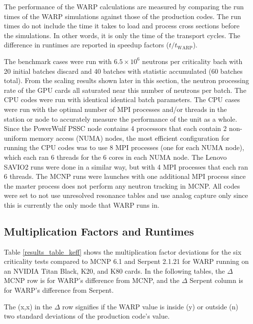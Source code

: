 \documentclass[preprint,12pt]{elsarticle}
\begin{document}
The performance of the WARP calculations are measured by comparing the run times of the WARP simulations against those of the production codes.  The run times do not include the time it takes to load and process cross sections before the simulations.  In other words, it is only the time of the transport cycles.  The difference in runtimes are reported in speedup factors ($t/t_\mathrm{WARP}$). 

The benchmark cases were run with $6.5\times10^6$ neutrons per criticality bach with 20 initial batches discard and 40 batches with statistic accumulated (60 batches total).  From the scaling results shown later in this section, the neutron processing rate of the GPU cards all saturated near this number of neutrons per batch.  The CPU codes were run with identical identical batch parameters.  The CPU cases were run with the optimal number of MPI processes and/or threads in the station or node to accurately measure the performance of the unit as a whole.  Since the PowerWulf PSSC node contains 4 processors that each contain 2 non-uniform memory access (NUMA) nodes, the most efficient configuration for running the CPU codes was to use 8 MPI processes (one for each NUMA node), which each ran 6 threads for the 6 cores in each NUMA node.  The Lenovo SAVIO2 runs were done in a similar way, but with 4 MPI processes that each ran 6 threads.  The MCNP runs were launches with one additional MPI process since the master process does not perform any neutron tracking in MCNP.  All codes were set to not use unresolved resonance tables and use analog capture only since this is currently the only mode that WARP runs in.

\subsection{Multiplication Factors and Runtimes}

Table \ref{results_table_keff} shows the multiplication factor deviations for the six criticality tests compared to MCNP 6.1 and Serpent 2.1.21 for WARP running on an NVIDIA Titan Black, K20, and K80 cards.  In the following tables, the $\Delta$MCNP row is for WARP's difference from MCNP, and the $\Delta$ Serpent column is for WARP's difference from Serpent.  

The (x,x) in the $\Delta$ row signifies if the WARP value is inside (y) or outside (n) two standard deviations of the production code's value.  
\end{document}
